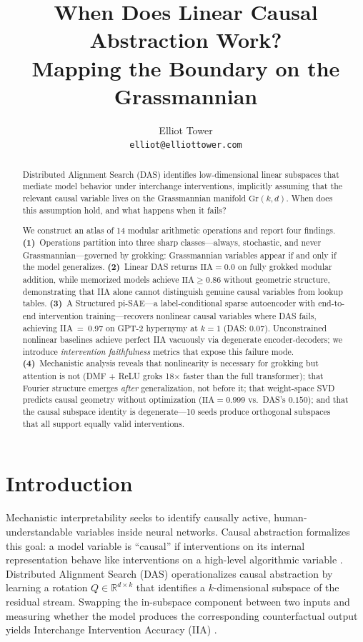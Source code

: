 \documentclass{article}
\title{When Does Linear Causal Abstraction Work?\\
Mapping the Boundary on the Grassmannian}
\author{
Elliot Tower \\
\texttt{elliot@elliottower.com}
}
\newcommand{\Gr}{\mathrm{Gr}}
\newcommand{\IIA}{\mathrm{IIA}}
\newcommand{\R}{\mathbb{R}}
\begin{document}
\maketitle

\begin{abstract}
Distributed Alignment Search (DAS) identifies low-dimensional linear subspaces
that mediate model behavior under interchange interventions, implicitly assuming
that the relevant causal variable lives on the Grassmannian manifold
$\Gr(k,d)$. When does this assumption hold, and what happens when it fails?

We construct an atlas of 14 modular arithmetic operations and report four
findings. \textbf{(1)}~Operations partition into three sharp classes---always,
stochastic, and never Grassmannian---governed by grokking: Grassmannian
variables appear if and only if the model generalizes.
\textbf{(2)}~Linear DAS returns $\IIA = 0.0$ on fully grokked modular
addition, while memorized models achieve $\IIA \geq 0.86$ without geometric
structure, demonstrating that IIA alone cannot distinguish genuine causal
variables from lookup tables.
\textbf{(3)}~A Structured pi-SAE---a label-conditional sparse autoencoder
with end-to-end intervention training---recovers nonlinear causal variables
where DAS fails, achieving IIA~=~0.97 on GPT-2 hypernymy at $k{=}1$ (DAS:
0.07). Unconstrained nonlinear baselines achieve perfect IIA vacuously via
degenerate encoder-decoders; we introduce \emph{intervention faithfulness}
metrics that expose this failure mode.
\textbf{(4)}~Mechanistic analysis reveals that nonlinearity is necessary for
grokking but attention is not (DMF + ReLU groks 18$\times$ faster than the
full transformer); that Fourier structure emerges \emph{after} generalization,
not before it; that weight-space SVD predicts causal geometry without
optimization ($\IIA = 0.999$ vs.\ DAS's $0.150$); and that the causal
subspace identity is degenerate---10 seeds produce orthogonal subspaces
that all support equally valid interventions.
\end{abstract}

\section{Introduction}
\label{sec:intro}

Mechanistic interpretability seeks to identify causally active,
human-understandable variables inside neural networks. Causal abstraction
formalizes this goal: a model variable is ``causal'' if interventions on its
internal representation behave like interventions on a high-level algorithmic
variable \citep{geiger2021causal}. Distributed Alignment Search (DAS)
operationalizes causal abstraction by learning a rotation $Q \in \R^{d \times k}$
that identifies a $k$-dimensional subspace of the residual stream. Swapping the
in-subspace component between two inputs and measuring whether the model
produces the corresponding counterfactual output yields Interchange Intervention
Accuracy (IIA) \citep{geiger2023finding}.
\end{document}
